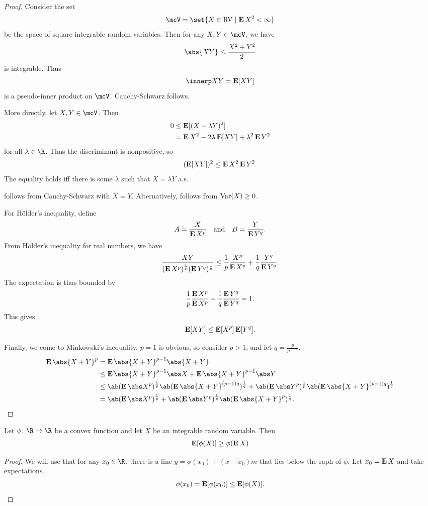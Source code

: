 \begin{proof}
    Consider the set \[
        \mcV = \set{X \in \RV \mid \E X^2 < \infty}
    \] be the space of square-integrable random variables.
    Then for any $X, Y \in \mcV$, we have \[
        \abs{XY} \le \frac{X^2 + Y^2}{2}
    \] is integrable.
    Thus \[
        \innerp XY = \E[XY]
    \] is a pseudo-inner product on $\mcV$.
    Cauchy-Schwarz follows.

    More directly, let $X, Y \in \mcV$.
    Then \begin{align*}
        0 &\le \operatorname{\mathbf E}[(X - \lambda Y)^2] \\
        &= \operatorname{\mathbf E} X^2 - 2 \lambda \operatorname{\mathbf E}[XY] + \lambda^2 \operatorname{\mathbf E} Y^2
    \end{align*} for all $\lambda \in \R$.
    Thus the discriminant is nonpositive, so \[
        (\operatorname{\mathbf E}[XY])^2 \le \operatorname{\mathbf E} X^2 \operatorname{\mathbf E} Y^2.
    \] The equality holds iff there is some $\lambda$ such that
    $X = \lambda Y$ a.s.

     follows from Cauchy-Schwarz
    with $X = Y$.
    Alternatively, follows from $\operatorname{Var}(X) \ge 0$.

    For H\"older's inequality, define \[
        A = \frac{X}{\operatorname{\mathbf E} X^p} \quad \text{and} \quad B = \frac{Y}{\operatorname{\mathbf E} Y^q}.
    \] From H\"older's inequality for real numbers, we have \[
        \frac{XY}{(\operatorname{\mathbf E} X^p)^{\frac1p} (\operatorname{\mathbf E} Y^q)^{\frac1q}}
        \le \frac1p \frac{X^p}{\operatorname{\mathbf E} X^p} + \frac1q \frac{Y^q}{\operatorname{\mathbf E} Y^q}.
    \] The expectation is thus bounded by \[
        \frac1p \frac{\operatorname{\mathbf E} X^p}{\operatorname{\mathbf E} X^p} + \frac1q \frac{\operatorname{\mathbf E} Y^q}{\operatorname{\mathbf E} Y^q} = 1.
    \] This gives \[
        \operatorname{\mathbf E}[XY] \le \operatorname{\mathbf E}[X^p] \operatorname{\mathbf E}[Y^q].
    \]

    Finally, we come to Minkowski's inequality.
    $p = 1$ is obvious, so consider $p > 1$, and let $q = \frac{p}{p-1}$.
    \begin{align*}
        \E\abs{X + Y}^p &= \E\abs{X + Y}^{p-1} \abs{X + Y} \\
        &\le \E\abs{X + Y}^{p-1} \abs X + \E\abs{X + Y}^{p-1} \abs Y \\
        &\le \ab(\E\abs X^p)^{\frac1p} \ab(\E\abs{X + Y}^{(p-1)q})^{\frac1q}
        + \ab(\E\abs Y^p)^{\frac1p} \ab(\E\abs{X + Y}^{(p-1)q})^{\frac1q} \\
        &= \ab(\E\abs X^p)^{\frac1p} + \ab(\E\abs Y^p)^{\frac1p}
            \ab(\E\abs{X + Y}^p)^{\frac1q}.
    \end{align*}
\end{proof}

\begin{theorem} \label{thm:exp:jensen}
    Let $\phi\colon \R \to \R$ be a convex function and let $X$ be
    an integrable random variable.
    Then \[
        \operatorname{\mathbf E}[\phi(X)] \ge \phi(\operatorname{\mathbf E} X)
    \]
\end{theorem}
\begin{proof}
    We will use that for any $x_0 \in \R$, there is a line
    $y = \phi(x_0) + (x - x_0)m$ that lies below the raph of $\phi$.
    Let $x_0 = \operatorname{\mathbf E} X$ and take expectations.
    \[
        \phi(x_0) = \operatorname{\mathbf E}[\phi(x_0)] \le \operatorname{\mathbf E}[\phi(X)].
    \]
\end{proof}
